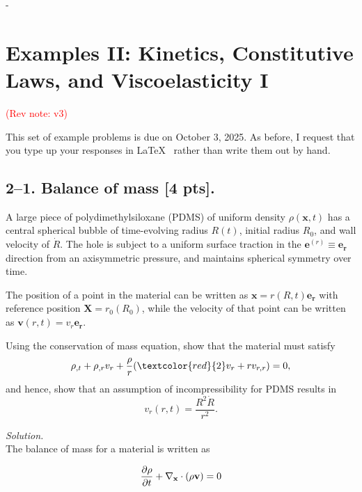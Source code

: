 -\setcounter{section}{1} %


\section*{Examples II: Kinetics, Constitutive Laws, and Viscoelasticity I}
\label{PS2}
\textcolor{red}{(Rev note: v3)}


This set of example problems is due on October 3, 2025. 
As before, I request that you type up your responses in \LaTeX~ rather than write them out by hand. 

\medskip
\subsection*{2--1. \textbf{Balance of mass} [4 pts].} 
A large piece of polydimethylsiloxane (PDMS) of uniform density $\rho(\bm{x},t)$ has a central spherical bubble of time-evolving radius $R(t)$, initial radius $R_0$, and wall velocity of $\dot{R}$. 
The hole is subject to a uniform surface traction in the $\bm{e}^{(r)} \equiv \bm{e}_{\bm{r}}$ direction from an axisymmetric pressure, and maintains spherical symmetry over time. 

\medskip
The position of a point in the material can be written as $\bm{x} = r(R,t) \bm{e}_{\bm{r}}$ with reference position $\bm{X} = r_0(R_0)$, while the velocity of that point can be written as $\bm{v}(r,t) = v_r \bm{e}_{\bm{r}}$.

\medskip
Using the conservation of mass equation, show that the material must satisfy
\begin{equation*}
\rho_{,t}+ \rho_{,r} v_r + \frac{\rho}{r} (\textcolor{red}{2}v_r + r v_{r,r}) = 0,
\end{equation*}
and hence, show that an assumption of incompressibility for PDMS results in 
\begin{equation*}
v_r(r,t) = \frac{R^2 \dot{R}}{r^2}.
\end{equation*}

\bigskip

\textit{Solution.}\\

The balance of mass for a material is written as 

\begin{equation*}
    \frac{\partial\rho}{\partial t} + \mathbf{\nabla}_\mathbf{x} \cdot(\rho\mathbf{v}) = 0 \\
\end{equation*}

